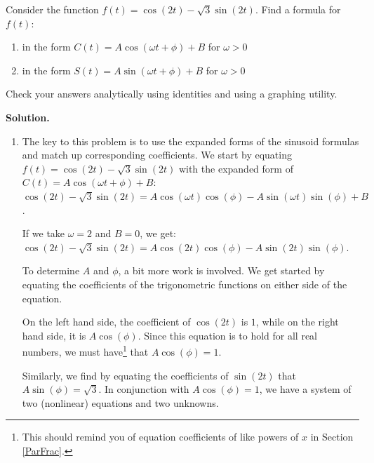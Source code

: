 \documentclass{ximera}
\begin{document}
\begin{example}  \label{expandedsinusoidex1}  Consider the function $f(t) = \cos(2t) - \sqrt{3} \sin(2t)$. Find a formula for $f(t)$:

\begin{enumerate}

\item  in the form $C(t) = A \cos(\omega t + \phi) + B$ for $\omega > 0$

\item  in the form $S(t) = A \sin(\omega t + \phi) + B$ for $\omega > 0$

\end{enumerate}

Check your answers analytically using identities and using a graphing utility.

\newpage

{\bf Solution.}

\begin{enumerate}

\item The key to this problem is to use the expanded forms of the sinusoid formulas and match up corresponding coefficients.  We start by equating  $f(t) = \cos(2t) - \sqrt{3} \sin(2t)$ with the expanded form of $C(t) = A \cos(\omega t + \phi) + B$: $\cos(2t) - \sqrt{3} \sin(2t) = A\cos(\omega t) \cos(\phi) - A \sin(\omega t) \sin(\phi) + B$.

 

If we take $\omega = 2$ and $B = 0$, we get:  $\cos(2t) - \sqrt{3} \sin(2t) = A\cos(2t) \cos(\phi) - A \sin(2t)\sin(\phi)$.

 

To determine $A$ and $\phi$, a bit more work is involved.  We get started by equating the coefficients of the trigonometric functions on either side of the equation. 

 

 On the left hand side, the coefficient of $\cos(2t)$ is $1$, while on the right hand side, it is $A \cos(\phi)$.  Since this equation is to hold for all real numbers, we must have\footnote{This should remind you of equation coefficients of like powers of $x$ in Section \ref{ParFrac}.} that $A \cos(\phi) = 1$.   
 
  
 
 Similarly, we find by equating the coefficients of $\sin(2t)$ that $A \sin(\phi) = \sqrt{3}$. In conjunction with  $A \cos(\phi) = 1$, we have a system of two (nonlinear) equations and two unknowns.  
 

\end{enumerate}
\end{example}
\end{document}
